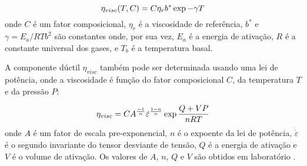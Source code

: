 \begin{equation}{\label{frank-kamenetskii}}
    \eta_{visc}(T,C)=C\eta_{r}b^{*}\exp{-\gamma T}
\end{equation}
\noindent onde $C$ é um fator composicional, $\eta_{r}$ é a viscosidade de referência, $b^{*}$ e $\gamma= E_a/RTb^2$ são constantes onde, por sua vez, $E_a$ é a energia de ativação, $R$ é a constante universal dos gases, e $T_b$ é a temperatura basal.

A componente dúctil $\eta_{visc}$ também pode ser determinada usando uma lei de potência, onde a viscosidade é função do fator composicional $C$, da temperatura $T$ e da pressão $P$:

\begin{equation}{\label{power-law}}
    \eta_{visc} = C A^{\frac{-1}{n}} \dot{\varepsilon}^{\frac{1-n}{n}} \exp{\frac{Q+V P}{nRT}}
\end{equation}
\noindent onde $A$ é um fator de escala pre-exponencial, $n$ é o expoente da lei de potência, $\dot{\varepsilon}$ é o segundo invariante do tensor desviante de tensão, $Q$ é a energia de ativação e $V$ é o volume de ativação. Os valores de $A$, $n$, $Q$ e $V$ são obtidos em laboratório \citep{karato1993,gleason1995}.





